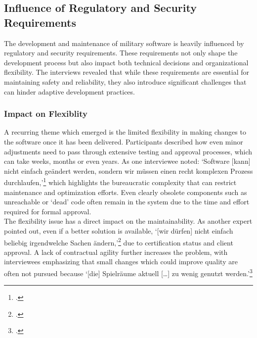 \subsection{Influence of Regulatory and Security Requirements}
The development and maintenance of military software is heavily influenced by regulatory and security requirements. These requirements not only shape the development process but also impact both technical decisions and organizational flexibility.
The interviews revealed that while these requirements are essential for maintaining safety and reliability, they also introduce significant challenges that can hinder adaptive development practices.

\subsubsection{Impact on Flexiblity}
A recurring theme which emerged is the limited flexibility in making changes to the software once it has been delivered. Participants described how even minor adjustments need to pass through extensive testing and approval processes, which can take weeks, months or even years.
As one interviewee noted: `Software [kann] nicht einfach geändert werden, sondern wir müssen einen recht komplexen Prozess durchlaufen,'\footcite{Interview22025} which highlights the bureaucratic complexity that can restrict maintenance and optimization efforts. Even clearly obsolete components such as unreachable or `dead' code
often remain in the system due to the time and effort required for formal approval.\\

The flexibility issue has a direct impact on the maintainability. As another expert pointed out, even if a better solution is available, `[wir dürfen] nicht einfach beliebig irgendwelche Sachen ändern,'\footcite{Interview32025} due to certification status and client approval. A lack of contractual agility further increases the problem,
with interviewees emphasizing that small changes which could improve quality are often not pursued because `[die] Spielräume aktuell [\ldots] zu wenig genutzt werden.'\footcite{Interview32025}

